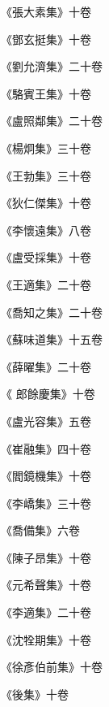 \begin{pinyinscope}
 《張大素集》十卷



 《鄧玄挺集》十卷



 《劉允濟集》二十卷



 《駱賓王集》十卷



 《盧照鄰集》二十卷



 《楊炯集》三十卷



 《王勃集》三十卷



 《狄仁傑集》十卷



 《李懷遠集》八卷



 《盧受採集》十卷



 《王適集》二十卷



 《喬知之集》二十卷



 《蘇味道集》十五卷



 《薛曜集》二十卷



 《
 郎餘慶集》十卷



 《盧光容集》五卷



 《崔融集》四十卷



 《閻鏡機集》十卷



 《李嶠集》三十卷



 《喬備集》六卷



 《陳子昂集》十卷



 《元希聲集》十卷



 《李適集》二十卷



 《沈牷期集》十卷



 《徐彥伯前集》十卷



 《後集》十卷




\end{pinyinscope}
